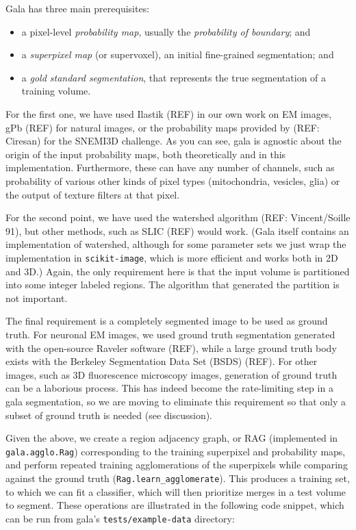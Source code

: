 \documentclass{frontiersSCNS} %
\begin{document}
Gala has three main prerequisites:
\begin{itemize}
\item a pixel-level \emph{probability map}, usually the \emph{probability of boundary}; and
\item a \emph{superpixel map} (or supervoxel), an initial fine-grained segmentation; and
\item a \emph{gold standard segmentation}, that represents the true segmentation of a training volume.
\end{itemize}

For the first one, we have used Ilastik (REF) in our own work on EM images, gPb (REF) for natural images, or the probability maps provided by (REF: Ciresan) for the SNEMI3D challenge.
As you can see, gala is agnostic about the origin of the input probability maps, both theoretically and in this implementation.
Furthermore, these can have any number of channels, such as probability of various other kinds of pixel types (mitochondria, vesicles, glia) or the output of texture filters at that pixel.

For the second point, we have used the watershed algorithm (REF: Vincent/Soille 91), but other methods, such as SLIC (REF) would work.
(Gala itself contains an implementation of watershed, although for some parameter sets we just wrap the implementation in \texttt{scikit-image}, which is more efficient and works both in 2D and 3D.)
Again, the only requirement here is that the input volume is partitioned into some integer labeled regions.
The algorithm that generated the partition is not important.

The final requirement is a completely segmented image to be used as ground truth.
For neuronal EM images, we used ground truth segmentation generated with the open-source Raveler software (REF), while a large ground truth body exists with the Berkeley Segmentation Data Set (BSDS) (REF).
For other images, such as 3D fluorescence microscopy images, generation of ground truth can be a laborious process.
This has indeed become the rate-limiting step in a gala segmentation, so we are moving to eliminate this requirement so that only a subset of ground truth is needed (see discussion).

Given the above, we create a region adjacency graph, or RAG (implemented in \texttt{gala.agglo.Rag}) corresponding to the training superpixel and probability maps, and perform repeated training agglomerations of the superpixels while comparing against the ground truth (\texttt{Rag.learn\_agglomerate}).
This produces a training set, to which we can fit a classifier, which will then prioritize merges in a test volume to segment.
These operations are illustrated in the following code snippet, which can be run from gala's \texttt{tests/example-data} directory:
\end{document}
